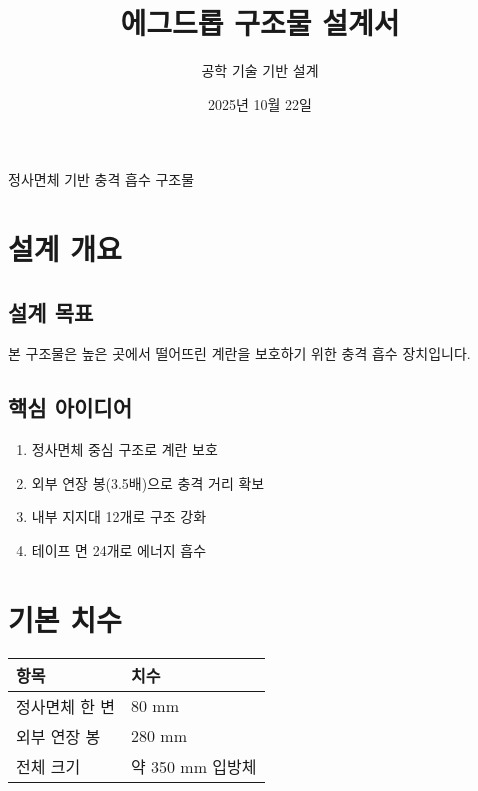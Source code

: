 \documentclass[a4paper,12pt]{article}
\title{\Large\textbf{에그드롭 구조물 설계서}}
\author{공학 기술 기반 설계}
\date{2025년 10월 22일}
\begin{document}
\begin{CJK}{UTF8}{mj}

\maketitle

\begin{center}
\large 정사면체 기반 충격 흡수 구조물
\end{center}

\vspace{1cm}
\tableofcontents
\newpage

\section{설계 개요}

\subsection{설계 목표}
본 구조물은 높은 곳에서 떨어뜨린 계란을 보호하기 위한 충격 흡수 장치입니다.

\subsection{핵심 아이디어}
\begin{enumerate}
    \item 정사면체 중심 구조로 계란 보호
    \item 외부 연장 봉(3.5배)으로 충격 거리 확보
    \item 내부 지지대 12개로 구조 강화
    \item 테이프 면 24개로 에너지 흡수
\end{enumerate}

\section{기본 치수}

\begin{center}
\begin{tabular}{ll}
\toprule
\textbf{항목} & \textbf{치수} \\
\midrule
정사면체 한 변 & 80 mm \\
외부 연장 봉 & 280 mm \\
전체 크기 & 약 350 mm 입방체 \\
\bottomrule
\end{tabular}
\end{center}


\end{CJK}
\end{document}
